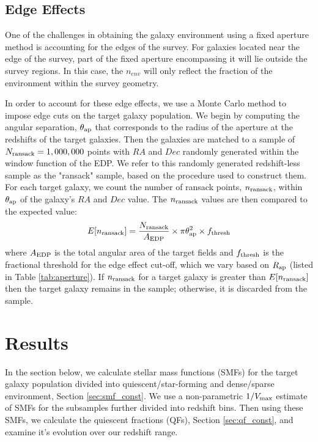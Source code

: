 \documentclass{emulateapj}
\begin{document}
\subsection{Edge Effects} \label{sec:edgeeffect}
One of the challenges in obtaining the galaxy environment using a fixed aperture method is accounting for the edges of the survey.
For galaxies located near the edge of the survey, part of the fixed aperture encompassing it will lie outside the survey regions. 
In this case, the $n_{env}$ will only reflect the fraction of the environment within the survey geometry.

In order to account for these edge effects, we use a Monte Carlo method to impose edge cuts on the target 
galaxy population. 
We begin by computing the angular separation, $\theta_{\rm{ap}}$ that corresponds to the radius of the 
aperture at the redshifts of the target galaxies.
Then the galaxies are matched to a sample of $N_{\rm{ransack}}=1,000,000$ points with $RA$ and $Dec$
 randomly generated within the window function of the EDP.  
We refer to this randomly generated redshift-less sample as the "ransack" sample, based on the procedure 
used to construct them. 
For each target galaxy, we count the number of ransack points, $n_{\rm{ransack}}$, within $\theta_{\rm{ap}}$
of the galaxy's $RA$ and $Dec$ value.
The $n_{\rm{ransack}}$ values are then compared to the expected value:
\begin{equation} \label{eq:ransack}
E[n_{\rm{ransack}}] = \frac{N_{\rm{ransack}}}{A_{\rm{EDP}}}\times {\pi \theta_{\rm{ap}}^2} \times f_{\rm{thresh}} 
\end{equation} 
where $A_{\rm{EDP}}$ is the total angular area of the target fields and $f_{\rm{thresh}}$ is the fractional 
threshold for the edge effect cut-off, which we vary based on $R_{\rm{ap}}$ (listed in Table \ref{tab:aperture}).
If $n_{\rm{ransack}}$ for a target galaxy is greater than $E[n_{\rm{ransack}}]$ then the target galaxy remains
in the sample; otherwise, it is discarded from the sample. 

\section{Results}
In the section below, we calculate stellar mass functions (SMFs) for the target galaxy population divided into 
quiescent/star-forming and dense/sparse environment, Section \ref{sec:smf_const}. We use a non-parametric 
$1/V_{\rm{max}}$ estimate of SMFs for the subsamples further divided into redshift bins. Then using these 
SMFs, we calculate the quiescent fractions (QFs), Section \ref{sec:qf_const}, 
and examine it's evolution over our redshift range. 
\end{document}
